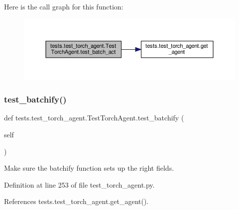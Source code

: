 Here is the call graph for this function\+:
\nopagebreak
\begin{figure}[H]
\begin{center}
\leavevmode
\includegraphics[width=350pt]{classtests_1_1test__torch__agent_1_1TestTorchAgent_aed82743e884c933453d912cfa8c7ec7f_cgraph}
\end{center}
\end{figure}
\mbox{\label{classtests_1_1test__torch__agent_1_1TestTorchAgent_aad1075dad0c291b524d84ec9526177dd}} 
\subsubsection{\texorpdfstring{test\+\_\+batchify()}{test\_batchify()}}
{\footnotesize\ttfamily def tests.\+test\+\_\+torch\+\_\+agent.\+Test\+Torch\+Agent.\+test\+\_\+batchify (\begin{DoxyParamCaption}\item[{}]{self }\end{DoxyParamCaption})}

\begin{DoxyVerb}Make sure the batchify function sets up the right fields.\end{DoxyVerb}
 

Definition at line 253 of file test\+\_\+torch\+\_\+agent.\+py.



References tests.\+test\+\_\+torch\+\_\+agent.\+get\+\_\+agent().


